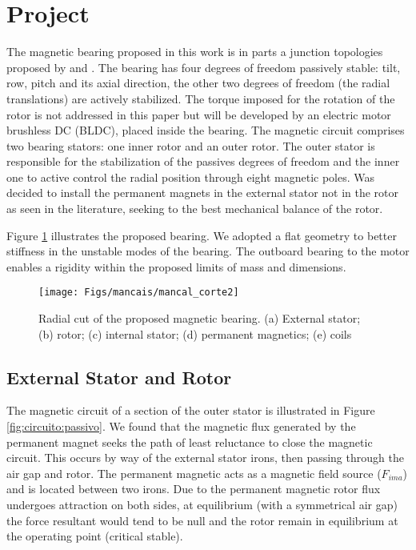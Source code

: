 \documentclass[10pt,fleqn,a4paper,twoside]{article}
\begin{document}

\section{Project}

The magnetic bearing proposed in this work is in parts a junction topologies proposed by \cite{Bernus1998} and \cite{Scharfe2001}. The bearing has four degrees of freedom passively stable: tilt, row, pitch and its axial direction, the other two degrees of freedom (the radial translations) are actively stabilized. The torque imposed for the rotation of the rotor is not addressed in this paper but will be developed by an electric motor brushless DC (BLDC), placed inside the bearing. The magnetic circuit comprises two bearing stators: one inner rotor and an outer rotor. The outer stator is responsible for the stabilization of the passives degrees of freedom and the inner one to active control the radial position through eight magnetic poles. Was decided to install the permanent magnets in the external stator not in the rotor as seen in the literature, seeking to the best mechanical balance of the rotor.

Figure \ref{fig:mancal:corte} illustrates the proposed bearing. We adopted a flat geometry to better stiffness in the unstable modes of the bearing. The outboard bearing to the motor enables a rigidity within the proposed limits of mass and dimensions.

\begin{figure}
\centering
\texttt{[image: Figs/mancais/mancal\_corte2]}
\caption{Radial cut of the proposed magnetic bearing. (a) External stator; (b) rotor; (c) internal stator; (d) permanent magnetics; (e) coils}
\label{fig:mancal:corte}
\end{figure}

\subsection{External Stator and Rotor}

The magnetic circuit of a section of the outer stator is illustrated in Figure \ref{fig:circuito:passivo}. We found that the magnetic flux generated by the permanent magnet seeks the path of least reluctance to close the magnetic circuit. This occurs by way of the external stator irons, then passing through the air gap and rotor. The permanent magnetic acts as a magnetic field source ($ F_ {ima} $) and is located between two irons. Due to the permanent magnetic rotor flux undergoes attraction on both sides, at equilibrium (with a symmetrical air gap) the force resultant would tend to be null and the rotor remain in equilibrium at the operating point (critical stable). 
\end{document}
